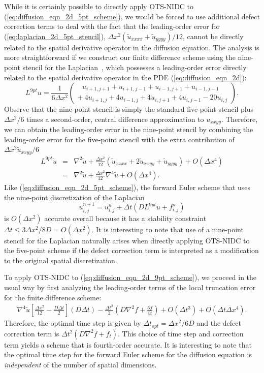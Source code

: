 \documentclass[fleqn,12pt,twoside]{article}
\newcommand{\beq}{\begin{equation}}
\newcommand{\eeq}{\end{equation}}
\newcommand{\bea}{\begin{eqnarray}}
\newcommand{\eea}{\end{eqnarray}}
\def\pt{\partial t}
\def\tu{\tilde{u}}
\def\dt{\Delta t}
\def\dx{\Delta x}
\def\dto{\dt_{opt}}
\begin{document}
While it is certainly possible to directly apply OTS-NIDC
to (\ref{eq:diffusion_eqn_2d_5pt_scheme}), we would be forced to use additional
defect correction terms to deal with the fact that the leading-order error for 
(\ref{eq:laplacian_2d_5pt_stencil}), 
$\dx^2 \left(\tu_{xxxx} + \tu_{yyyy}\right)/12$, cannot be directly related 
to the spatial derivative operator in the diffusion equation.  
The analysis is more straightforward if we construct our finite difference 
scheme using the nine-point stencil for the 
Laplacian~\cite{iserles_book,patra_2005}, which possesses a leading-order 
error directly related to the spatial derivative operator in the PDE 
(\ref{eq:diffusion_eqn_2d}):
\beq
  L^{9pt} u = \frac{1}{6 \dx^2} \left( 
      \begin{array}{l}
         \ \ \ u_{i+1,j+1} + u_{i+1,j-1}
            + u_{i-1,j+1} + u_{i-1,j-1} \\
         +\ 4 u_{i+1,j} + 4 u_{i-1,j}
           + 4 u_{i,j+1} + 4 u_{i,j-1}
           -20 u_{i,j} 
      \end{array}
    \right). 
  \label{eq:laplacian_2d_9pt_stencil}
\eeq
Observe that the nine-point stencil is simply the standard five-point 
stencil plus $\dx^2/6$ times a second-order, central difference 
approximation to $u_{xxyy}$.  Therefore, we can obtain the leading-order 
error in the nine-point stencil by combining the leading-order error for the 
five-point stencil with the extra contribution of 
$\dx^2 \tu_{xxyy}/6$
\bea
L^{9pt} \tu &=& \nabla^2 \tu 
              + \frac{\dx^2}{12} 
                \left(\tu_{xxxx} + 2 \tu_{xxyy} + \tu_{yyyy}\right)
              + O(\dx^4)
          \nonumber \\
          &=& \nabla^2 \tu + \frac{\dx^2}{12} \nabla^4 \tu + O(\dx^4).
  \label{eq:laplacian_2d_9pt_stencil_error}
\eea
Like (\ref{eq:diffusion_eqn_2d_5pt_scheme}), the forward Euler scheme that 
uses the nine-point discretization of the Laplacian 
\beq
  u^{n+1}_{i,j} = u^{n}_{i,j}
  + \dt \left( D L^{9pt} u + f_{i,j}^n \right)
  \label{eq:diffusion_eqn_2d_9pt_scheme}
\eeq
is $O(\dx^2)$ accurate overall because it has a stability constraint 
$\dt \le 3\dx^2/8D = O(\dx^2)$.
It is interesting to note that use of a nine-point stencil for the Laplacian 
naturally arises when directly applying OTS-NIDC to the five-point scheme if 
the defect correction term is interpreted as a modification to the original 
spatial discretization.

To apply OTS-NIDC to (\ref{eq:diffusion_eqn_2d_9pt_scheme}), we proceed in the 
usual way by first analyzing the leading-order terms of the local truncation
error for the finite difference scheme:
\bea
  \nabla^4 \tu
      \left[ \frac{\dx^2}{12} - \frac{D \dt}{2}  \right] (D \dt)
  - \frac{\dt^2}{2} \left( D\nabla^2 f + \frac{\partial f}{\pt} \right)
  + O(\dt^3) + O(\dt \dx^4).
  \label{eq:diffusion_eqn_2d_trunc_err}
\eea
Therefore, the optimal time step is given by $\dto = \dx^2/6D$ and the 
defect correction term is $\dt^2 \left( D\nabla^2 f + f_t \right)$.
This choice of time step and correction term yields a scheme that is 
fourth-order accurate.  It is interesting to note that the optimal time step
for the forward Euler scheme for the diffusion equation is \emph{independent} 
of the number of spatial dimensions.
\end{document}
